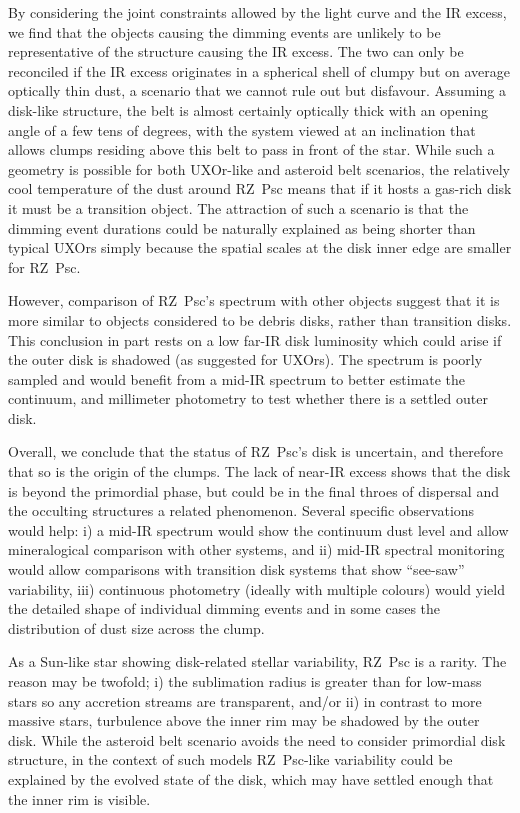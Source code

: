 \documentclass[]{rsos}
\begin{document}
By considering the joint constraints allowed by the light curve and the IR excess, we
find that the objects causing the dimming events are unlikely to be representative of the
structure causing the IR excess. The two can only be reconciled if the IR excess
originates in a spherical shell of clumpy but on average optically thin dust, a scenario
that we cannot rule out but disfavour. Assuming a disk-like structure, the belt is almost
certainly optically thick with an opening angle of a few tens of degrees, with the system
viewed at an inclination that allows clumps residing above this belt to pass in front of
the star. While such a geometry is possible for both UXOr-like and asteroid belt
scenarios, the relatively cool temperature of the dust around RZ~Psc means that if it
hosts a gas-rich disk it must be a transition object. The attraction of such a scenario
is that the dimming event durations could be naturally explained as being shorter than
typical UXOrs simply because the spatial scales at the disk inner edge are smaller for
RZ~Psc.

However, comparison of RZ~Psc's spectrum with other objects suggest that it is more
similar to objects considered to be debris disks, rather than transition disks. This
conclusion in part rests on a low far-IR disk luminosity which could arise if the outer
disk is shadowed (as suggested for UXOrs). The spectrum is poorly sampled and would
benefit from a mid-IR spectrum to better estimate the continuum, and millimeter
photometry to test whether there is a settled outer disk.

Overall, we conclude that the status of RZ~Psc's disk is uncertain, and therefore that so
is the origin of the clumps. The lack of near-IR excess shows that the disk is beyond the
primordial phase, but could be in the final throes of dispersal and the occulting
structures a related phenomenon. Several specific observations would help: i) a mid-IR
spectrum would show the continuum dust level and allow mineralogical comparison with
other systems, and ii) mid-IR spectral monitoring would allow comparisons with transition
disk systems that show ``see-saw'' variability, iii) continuous photometry (ideally with
multiple colours) would yield the detailed shape of individual dimming events and in some
cases the distribution of dust size across the clump.

As a Sun-like star showing disk-related stellar variability, RZ~Psc is a rarity. The
reason may be twofold; i) the sublimation radius is greater than for low-mass stars so
any accretion streams are transparent, and/or ii) in contrast to more massive stars,
turbulence above the inner rim may be shadowed by the outer disk. While the asteroid belt
scenario avoids the need to consider primordial disk structure, in the context of such
models RZ~Psc-like variability could be explained by the evolved state of the disk, which
may have settled enough that the inner rim is visible.
\end{document}
